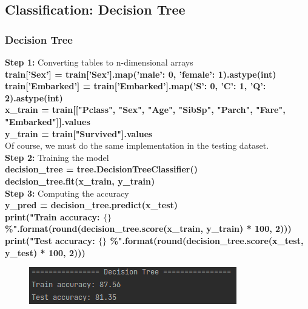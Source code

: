 \documentclass{beamer}
\begin{document}
\subsection{Classification: Decision Tree}
\begin{frame}
	\frametitle{Decision Tree}
	\begin{flushleft}
		\textbf{Step 1:} Converting tables to n-dimensional arrays \\
		\textbf{\color{blue} \scriptsize
			train['Sex'] = train['Sex'].map({'male': 0, 'female': 1}).astype(int) \\
			train['Embarked'] = train['Embarked'].map({'S': 0, 'C': 1, 'Q': 2}).astype(int) \\
			x\_train = train[["Pclass", "Sex", "Age", "SibSp", "Parch", "Fare", "Embarked"]].values \\
			y\_train = train["Survived"].values \\
		}
		Of course, we must do the same implementation in the testing dataset. \\
		\textbf{Step 2:} Training the model \\
		\textbf{\color{blue} \scriptsize
			decision\_tree = tree.DecisionTreeClassifier() \\
			decision\_tree.fit(x\_train, y\_train) \\
		}
		\textbf{Step 3:} Computing the accuracy \\
		\textbf{\color{blue} \scriptsize
			y\_pred = decision\_tree.predict(x\_test) \\
			print("Train accuracy: $\{\}$ \%".format(round(decision\_tree.score(x\_train, y\_train) * 100, 2))) \\
			print("Test accuracy: $\{\}$ \%".format(round(decision\_tree.score(x\_test, y\_test) * 100, 2)))
		}
	\end{flushleft}
	\begin{center}
		\begin{figure}
	    \includegraphics[width=0.5\linewidth]{./src/figures/7.png}
	  \end{figure}
	\end{center}
\end{frame}
\end{document}
